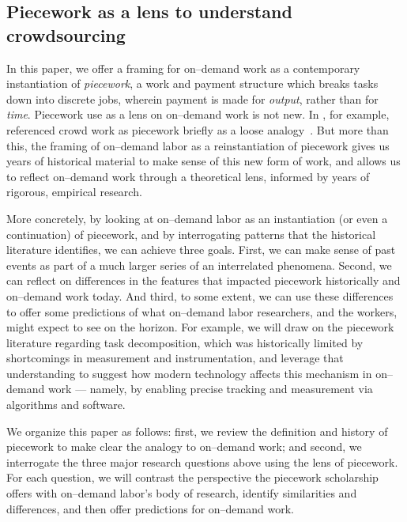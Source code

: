\documentclass[trackingWork]{subfiles}
\begin{document}
\subsection{Piecework as a lens to understand crowdsourcing}
In this paper, we offer a framing for on--demand work as a contemporary instantiation of \textit{piecework},
a work and payment structure which breaks tasks down into discrete jobs,
wherein payment is made for \textit{output}, rather than for \textit{time}.
Piecework use as a lens on on--demand work is not new.
In \citeyear{crowdworkFuture}, for example,
\citeauthor{crowdworkFuture} referenced crowd work as piecework briefly
as a loose analogy~\cite{crowdworkFuture}.
But more than this,
the framing of on--demand labor as a reinstantiation of piecework %
gives us years of historical material to make sense of this new form of work, and
allows us to reflect on--demand work through a theoretical lens, informed by years of rigorous, empirical research.

More concretely, by looking at on--demand labor as
an instantiation (or even a continuation) of piecework,
and by interrogating patterns that the historical literature identifies, we can achieve three goals.
First, we can make sense of past events as part of a much larger series of an interrelated phenomena.
Second, we can reflect on differences in the features that impacted piecework historically and on--demand work today.
And third, to some extent, we can use these differences to offer some predictions of what on--demand labor researchers,
and the workers,
might expect to see on the horizon.
For example, we will draw on the piecework literature regarding task decomposition,
which was historically limited by shortcomings in measurement and instrumentation, and
leverage that understanding to suggest how modern technology affects this mechanism in on--demand work
--- namely, by enabling precise tracking and measurement via algorithms and software.

We organize this paper as follows:
first, we review the definition and history of piecework
to make clear the analogy to on--demand work;
and second, we interrogate the three major research questions above using the lens of piecework. 
For each question, we will
contrast the perspective the piecework scholarship offers with on--demand labor's body of research,
identify similarities and differences, and then
offer predictions for on--demand work.
\end{document}

